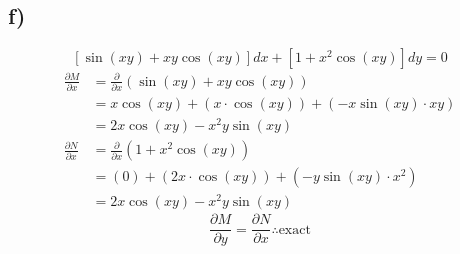 \documentclass{article}
\begin{document}
\subsection{f)}
$$ [\sin(xy) + xy\cos(xy)]dx + [1 + x^2\cos(xy)]dy = 0 $$
\begin{align*}
	\frac{\partial M}{\partial x} & = \frac{\partial}{\partial x} \left( \sin(xy) + xy\cos(xy) \right) \\
								  & = x\cos(xy) + (x \cdot \cos(xy)) + (-x\sin(xy) \cdot xy) \\
								  & = 2x\cos(xy) -x^2y\sin(xy) \\
	\frac{\partial N}{\partial x} & = \frac{\partial}{\partial x} \left( 1 + x^2\cos(xy) \right) \\
								  & = (0) + (2x \cdot \cos(xy)) + (-y\sin(xy) \cdot x^2) \\
								  & = 2x\cos(xy) -x^2y\sin(xy)
\end{align*}
\begin{equation*}
	\boxed{
		\frac{\partial M}{\partial y} = \frac{\partial N}{\partial x} \therefore \text{exact}
	}
\end{equation*}
\end{document}
